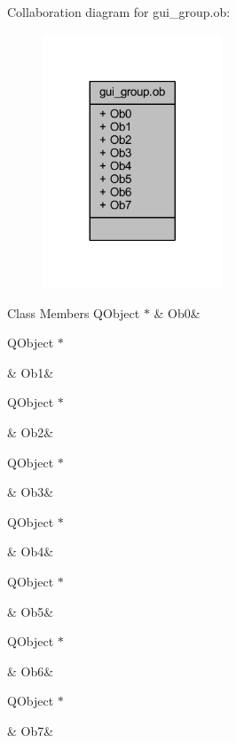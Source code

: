 Collaboration diagram for gui\+\_\+group.\+ob\+:
\nopagebreak
\begin{figure}[H]
\begin{center}
\leavevmode
\includegraphics[width=152pt]{df/da9/a00263}
\end{center}
\end{figure}
\begin{DoxyFields}{Class Members}
\hypertarget{a00001_ad62b33c824adb5d87e757be30a450cb2}{Q\+Object $\ast$}\label{a00001_ad62b33c824adb5d87e757be30a450cb2}
&
Ob0&
\\
\hline

\hypertarget{a00001_a5421cb845bd48e0a97a8c8eb93605010}{Q\+Object $\ast$}\label{a00001_a5421cb845bd48e0a97a8c8eb93605010}
&
Ob1&
\\
\hline

\hypertarget{a00001_a9593c0978523e4e993eced3667101c7d}{Q\+Object $\ast$}\label{a00001_a9593c0978523e4e993eced3667101c7d}
&
Ob2&
\\
\hline

\hypertarget{a00001_a486f686536f75c60bbec950758e8c94c}{Q\+Object $\ast$}\label{a00001_a486f686536f75c60bbec950758e8c94c}
&
Ob3&
\\
\hline

\hypertarget{a00001_a5d2364f75ea43b4684e831c5b24c1f78}{Q\+Object $\ast$}\label{a00001_a5d2364f75ea43b4684e831c5b24c1f78}
&
Ob4&
\\
\hline

\hypertarget{a00001_ae9ac768c69a9201734c5261a1c6c1395}{Q\+Object $\ast$}\label{a00001_ae9ac768c69a9201734c5261a1c6c1395}
&
Ob5&
\\
\hline

\hypertarget{a00001_a191cff49179dce8cb6a0f3847062e6d1}{Q\+Object $\ast$}\label{a00001_a191cff49179dce8cb6a0f3847062e6d1}
&
Ob6&
\\
\hline

\hypertarget{a00001_a60d4d196fab75dfde3fb055f6e7b0056}{Q\+Object $\ast$}\label{a00001_a60d4d196fab75dfde3fb055f6e7b0056}
&
Ob7&
\\
\hline

\end{DoxyFields}
\label{da/dec/a00080}
\hypertarget{a00001_da/dec/a00080}{}
